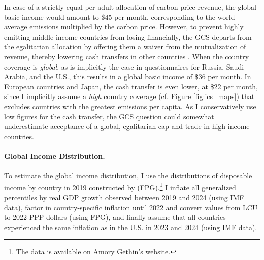 In case of a strictly equal per adult allocation of carbon price revenue, the global basic income would amount to \$45 per month, corresponding to the world average emissions multiplied by the carbon price. However, to prevent highly emitting middle-income countries from losing financially, the GCS departs from the egalitarian allocation by offering them a waiver from the mutualization of revenue, thereby lowering cash transfers in other countries \citep{fabre_plan_2024}. 
When the country coverage is \textit{global}, as is implicitly the case in questionnaires for Russia, Saudi Arabia, and the U.S., this results in a global basic income of \$36 per month. 
In European countries and Japan, the cash transfer is even lower, at \$22 per month, since I implicitly assume a \textit{high} country coverage (cf. Figure \ref{fig:ics_maps}) that excludes countries with the greatest emissions per capita. 
As I conservatively use low figures for the cash transfer, the GCS question could somewhat underestimate acceptance of a global, egalitarian cap-and-trade in high-income countries. 


\paragraph{Global Income Distribution.}

To estimate the global income distribution, I use the distributions of disposable income by country in 2019 constructed by \cite{fisher-post_government_2023} (FPG).\footnote{The data is available on Amory Gethin's \href{https://www.dropbox.com/scl/fi/rd1d7rke0wwwr6948ea67/fisher-gethin-redistribution-2025-01-10.dta}{website}.} I inflate all generalized percentiles by real GDP growth observed between 2019 and 2024 (using IMF data), factor in country-specific inflation until 2022 and convert values from LCU to 2022 PPP dollars (using FPG), and finally assume that all countries experienced the same inflation as in the U.S. in 2023 and 2024 (using IMF data). 

